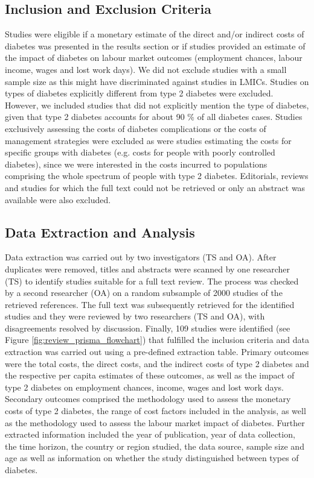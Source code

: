 \documentclass[12pt,english]{article}
\begin{document}
\subsection{Inclusion and Exclusion Criteria}
Studies were eligible if a monetary estimate of the direct and/or indirect costs of diabetes was presented in the results section or if studies provided an estimate of the impact of diabetes on labour market outcomes (employment chances, labour income, wages and lost work days). We did not exclude studies with a small sample size as this might have discriminated against studies in \acp{LMIC}. Studies on types of diabetes explicitly different from type 2 diabetes were excluded. However, we included studies that did not explicitly mention the type of diabetes, given that type 2 diabetes accounts for about 90 \% of all diabetes cases. Studies exclusively assessing the costs of diabetes complications or the costs of management strategies were excluded as were studies estimating the costs for specific groups with diabetes (e.g. costs for people with poorly controlled diabetes), since we were interested in the costs incurred to populations comprising the whole spectrum of people with type 2 diabetes. Editorials, reviews and studies for which the full text could not be retrieved or only an abstract was available were also excluded.

\subsection{Data Extraction and Analysis}
Data extraction was carried out by two investigators (TS and OA). After duplicates were removed, titles and abstracts were scanned by one researcher (TS) to identify studies suitable for a full text review. The process was checked by a second researcher (OA) on a random subsample of 2000 studies of the retrieved references. The full text was subsequently retrieved for the identified studies and they were reviewed by two researchers (TS and OA), with disagreements resolved by discussion. Finally, 109 studies were identified (see Figure \ref{fig:review_prisma_flowchart}) that fulfilled the inclusion criteria and data extraction was carried out using a pre-defined extraction table. Primary outcomes were the total costs, the direct costs, and the indirect costs of type 2 diabetes and the respective per capita estimates of these outcomes, as well as the impact of type 2 diabetes on employment chances, income, wages and lost work days. Secondary outcomes comprised the methodology used to assess the monetary costs of type 2 diabetes, the range of cost factors included in the analysis, as well as the methodology used to assess the labour market impact of diabetes. Further extracted information included the year of publication, year of data collection, the time horizon, the country or region studied, the data source, sample size and age as well as information on whether the study distinguished between types of diabetes.
\end{document}
